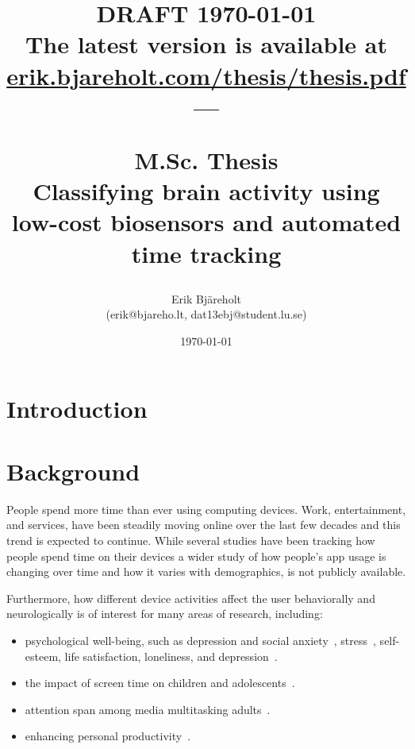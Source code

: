 \documentclass[a4paper]{article}
\title{%
    \small DRAFT \today \\
    \small The latest version is available at \href{https://erik.bjareholt.com/thesis/thesis.pdf}{erik.bjareholt.com/thesis/thesis.pdf}\\
    \large --- \\
    \large \par M.Sc. Thesis\\
    \huge Classifying brain activity using low-cost biosensors and automated time tracking \\
}
\author{Erik Bjäreholt \orcid{0000-0003-1350-9677} \\(erik@bjareho.lt, dat13ebj@student.lu.se)}
\date{\today}
\begin{document}
\maketitle

\begin{abstract}
\end{abstract}

\pagebreak %

\tableofcontents


\pagebreak %

\begin{refsection}

\section{Introduction}


\section{Background}

    People spend more time than ever using computing devices. Work, entertainment, and services, have been steadily moving online over the last few decades and this trend is expected to continue.
    While several studies have been tracking how people spend time on their devices a wider study of how people's app usage is changing over time and how it varies with demographics, is not publicly available.

    Furthermore, how different device activities affect the user behaviorally and neurologically is of interest for many areas of research, including:

    \begin{itemize}
        \item psychological well-being, such as depression and social anxiety~\cite{selfhout_different_2009}\cite{shah_nonrecursive_2002}, stress~\cite{mark_stress_2014}, self-esteem, life satisfaction, loneliness, and depression~\cite{huang_time_2017}.
        \item the impact of screen time on children and adolescents~\cite{subrahmanyam_impact_2001}.
        \item attention span among media multitasking adults~\cite{mark_stress_2014}.
        \item enhancing personal productivity~\cite{kim_timeaware_2016}.
    \end{itemize}


\end{refsection}
\end{document}
